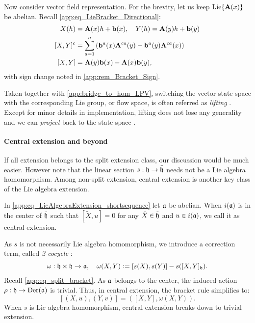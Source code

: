 Now consider vector field representation. For the brevity, let us keep $\text{Lie}{\{\mathbf{A}(x)\}}$ be abelian.
Recall \cref{app:eq_LieBracket_Directional}:
\begin{align}
X(h) &= \mathbf{A}(x)h + \mathbf{b}(x), \quad Y(h) = \mathbf{A}(y)h + \mathbf{b}(y) \nonumber \\
    [X,Y]^c &= \sum_{a=1}^{n}
    \left(
    \mathbf{b}^a(x)\mathbf{A}^{ca}(y)
    - \mathbf{b}^a(y)\mathbf{A}^{ca}(x)
    \right) \nonumber \\ 
    [X,Y] &= \mathbf{A}(y)\mathbf{b}(x) - \mathbf{A}(x)\mathbf{b}(y),\label{app:eq_LPV_affinebracket}
\end{align}
with sign change noted in \cref{app:rem_Bracket_Sign}.

Taken together with \cref{app:bridge_to_hom_LPV},
switching the vector state space
with the corresponding Lie group, or flow space,
is often referred as \emph{lifting} \cite{krener1977decomposition}.
Except for minor details in implementation, lifting does not lose any generality
and we can \emph{project} back to the state space \cite{iserles2000lie, iserles2008magnus}.
\paragraph{Central extension and beyond}
If all extension belongs to the split extension class, our discussion would be much easier.
However note that the linear section $s: \mathfrak{h} \to \tilde{\mathfrak{h}}$ needs not be a Lie algebra homomorphism.
Among non-split extension, central extension is another key class of the Lie algebra extension.
\begin{definition}
    In \cref{app:eq_LieAlgebraExtension_shortsequence} let $\mathfrak{a}$ be abelian.
    When $i(\mathfrak{a})$ is in the center of $\tilde{\mathfrak{h}}$ such that $[\tilde{X}, u] = 0$ for any $\tilde{X} \in \tilde{\mathfrak{h}}$
    and $u \in i(\mathfrak{a})$, we call it as central extension.
\end{definition}
As $s$ is not necessarily Lie algebra homomorphism, we introduce a correction term, called \emph{2-cocycle} \cite{weibel1994introduction}:
\begin{equation}
\label{app:eq_2cocycle}
    \omega: \mathfrak{h} \times \mathfrak{h} \to \mathfrak{a}, \quad
    \omega(X,Y) := [s(X),s(Y)] - s([X,Y]_{\mathfrak{h}}).
\end{equation}
Recall \cref{app:eq_split_bracket}.
As $\mathfrak{a}$ belongs to the center, the induced action $\rho: \mathfrak{h} \to \text{Der}(\mathfrak{a})$ is trivial.
Thus, in central extension, the bracket rule simplifies to:
\begin{equation*}
\label{app:eq_central_bracket}
[(X,u),(Y,v)] = ([X,Y], \omega(X,Y)).
\end{equation*}
When $s$ is Lie algebra homomorphism, central extension breaks down to trivial extension.

